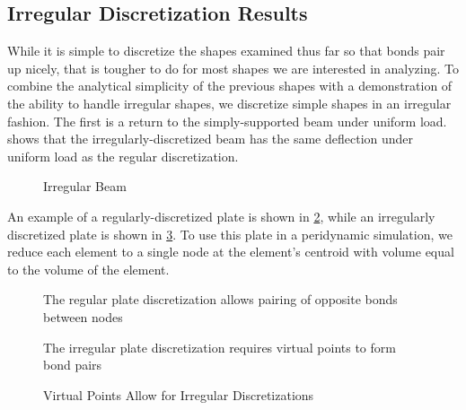 \subsection{Irregular Discretization Results}
While it is simple to discretize the shapes examined thus far so that bonds pair up nicely, that is tougher to do for most shapes we are interested in analyzing.
To combine the analytical simplicity of the previous shapes with a demonstration of the ability to handle irregular shapes, we discretize simple shapes in an irregular fashion.
The first is a return to the simply-supported beam under uniform load.
 shows that the irregularly-discretized beam has the same deflection under uniform load as the regular discretization.
%
\begin{figure}[tbhp]
  \centering
  \resizebox{0.6\linewidth}{!}{}
  \caption{Irregular Beam}
  \label{fig:BeamIrreg}
\end{figure}
%

An example of a regularly-discretized plate is shown in \cref{fig:regularmesh}, while an irregularly discretized plate is shown in \cref{fig:unevenmesh}.
To use this plate in a peridynamic simulation, we reduce each element to a single node at the element's centroid with volume equal to the volume of the element. 
%
\begin{figure}[h]
  \centering
  \resizebox{0.6\linewidth}{!}{}
  \caption[Regular Plate Discretization]{The regular plate discretization allows pairing of opposite bonds between nodes}
  \label{fig:regularmesh}
\end{figure}
%
\begin{figure}[tbhp]
  \centering
  \resizebox{0.6\linewidth}{!}{}
  \caption[Irregular Plate Discretization]{The irregular plate discretization requires virtual points to form bond pairs}
  \label{fig:unevenmesh}
\end{figure}
%
%
\begin{figure}[tbhp]
  \centering
  \resizebox{0.6\linewidth}{!}{}
  \caption{Virtual Points Allow for Irregular Discretizations}
  \label{fig:PlateIrreg}
\end{figure}
%

\FloatBarrier

